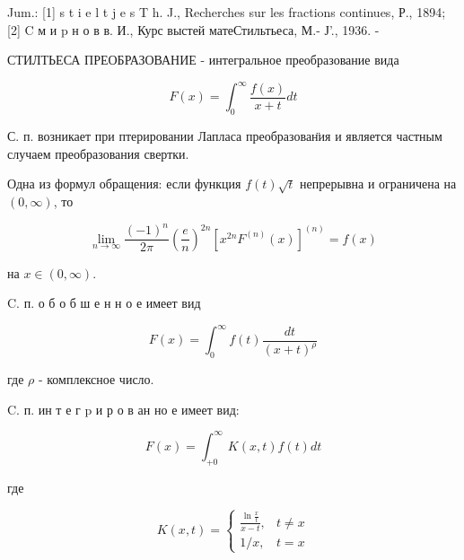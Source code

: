 \documentclass[10pt]{article}
\begin{document}
Jum.: [1] s t i e l t j e s T h. J., Recherches sur les fractions continues, Р., 1894; [2] C м и p н о в в. И., Курс выстей матеСтильтьеса, М.- Ј’., 1936. -



СТИЛТЬЕСА ПРЕОБРАЗОВАНИЕ - интегральное преобразование вида



\[

F(x)=\int_{0}^{\infty} \frac{f(x)}{x+t} d t

\]



С. п. возникает при птерировании Лапласа преобразован̈ия и является частным случаем преобразования свертки.



Одна из формул обращения: если функция $f(t) \sqrt{t}$ непрерывна и ограничена на $(0, \infty)$, то



\[

\lim _{n \rightarrow \infty} \frac{(-1)^{n}}{2 \pi}\left(\frac{e}{n}\right)^{2 n}\left[x^{2 n} F^{(n)}(x)\right]^{(n)}=f(x)

\]



на $x \in(0, \infty)$.



C. п. о б о б ш е н н о е имеет вид



\[

F(x)=\int_{0}^{\infty} f(t) \frac{d t}{(x+t)^{\rho}}

\]



где $\rho$ - комплексное число.



C. п. ин т е г p и р о в ан но е имеет вид:



\[

F(x)=\int_{+0}^{\infty} K(x, t) f(t) d t

\]



где



\[

K(x, t)= \begin{cases}\frac{\ln \frac{x}{t}}{x-t}, & t \neq x \\ 1 / x, & t=x\end{cases}

\]
\end{document}
